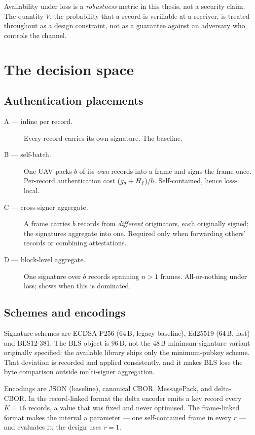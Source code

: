 \begin{remark}
Availability under loss is a \emph{robustness} metric in this thesis, not a security claim. The
quantity $V$, the probability that a record is verifiable at a receiver, is treated throughout as a
design constraint, not as a guarantee against an adversary who controls the channel.
\end{remark}

\section{The decision space}

\subsection{Authentication placements}

\begin{description}
\item[A --- inline per record.] Every record carries its own signature. The baseline.
\item[B --- self-batch.] One UAV packs $b$ of its \emph{own} records into a frame and signs the
      frame once. Per-record authentication cost $(g_a + H_f)/b$. Self-contained, hence loss-local.
\item[C --- cross-signer aggregate.] A frame carries $b$ records from \emph{different}
      originators, each originally signed; the signatures aggregate into one. Required only when
      forwarding others' records or combining attestations.
\item[D --- block-level aggregate.] One signature over $b$ records spanning $n > 1$ frames.
      All-or-nothing under loss;  shows when this is dominated.
\end{description}

\subsection{Schemes and encodings}

Signature schemes are ECDSA-P256 ($64$\,B, legacy baseline), Ed25519 ($64$\,B, fast) and BLS12-381.
The BLS object is $96$\,B, not the $48$\,B minimum-signature variant originally specified: the
available library ships only the minimum-pubkey scheme. That deviation is recorded and applied
consistently, and it makes BLS lose the byte comparison outside multi-signer aggregation.

Encodings are JSON (baseline), canonical CBOR, MessagePack, and delta-CBOR. In the record-linked format
the delta encoder emits a key record every $K = 16$ records, a value that was fixed and never
optimised. The frame-linked format makes the interval a parameter --- one self-contained frame in every
$r$ --- and  evaluates it; the design uses $r = 1$.

